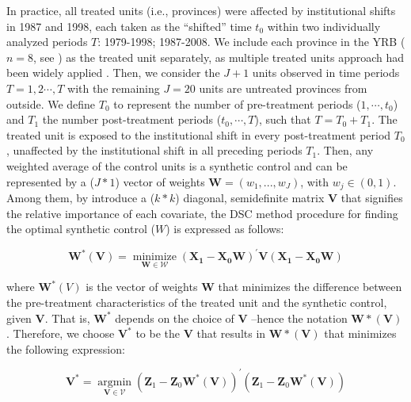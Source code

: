 \documentclass[default, sn-standardnature]{sn-jnl} %
\begin{document}
In practice, all treated units (i.e., provinces) were affected by institutional shifts in 1987 and 1998, each taken as the ``shifted'' time $t_0$ within two individually analyzed periods $T$: 1979-1998; 1987-2008.
We include each province in the YRB ($n=8$, see \textit{}) as the treated unit separately, as multiple treated units approach had been widely applied \cite{abadie2021}.
Then, we consider the $J+1$ units observed in time periods $T = {1,2 \cdots , T}$ with the remaining $J=20$ units are untreated provinces from outside.
We define $T_0$ to represent the number of pre-treatment periods ($1,\cdots,t_0$) and $T_1$ the number post-treatment periods ($t_0,\cdots,T$), such that $T = T_0+ T_1$.
The treated unit is exposed to the institutional shift in every post-treatment period $T_0$, unaffected by the institutional shift in all preceding periods $T_1$.
Then, any weighted average of the control units is a synthetic control and can be represented by a ($J * 1$) vector of weights $\mathbf{W} = (w_{1},...,w_{J})$, with $w_j \in (0, 1)$.
Among them, by introduce a ($k * k$) diagonal, semidefinite matrix $\mathbf{V}$ that signifies the relative importance of each covariate, the DSC method procedure for finding the optimal synthetic control ($W$) is expressed as follows:

\begin{equation}
    \mathbf{W^{*}(V)}=\underset{\mathbf{W} \in \mathcal{W}}{\operatorname{minimize}}\left(\mathbf{X}_{\mathbf{1}}-\mathbf{X}_{\mathbf{0}} \mathbf{W}\right)^{\prime} \mathbf{V}\left(\mathbf{X}_{\mathbf{1}}-\mathbf{X}_{\mathbf{0}} \mathbf{W}\right)
\end{equation}

where $\mathbf{W}^{*}(V)$ is the vector of weights $\mathbf{W}$ that minimizes the difference between the pre-treatment characteristics of the treated unit and the synthetic control, given $\mathbf{V}$. That is, $\mathbf{W^{*}}$ depends on the choice of $\mathbf{V}$ –hence the notation $\mathbf{W*(V)}$. Therefore, we choose $\mathbf{V^{*}}$ to be the $\mathbf{V}$ that results in $\mathbf{W*(V)}$ that minimizes the following expression:

\begin{equation}
    \mathbf{V}^{*}=\underset{\mathbf{V} \in \mathcal{V}}{\operatorname{argmin}}\left(\mathbf{Z}_{1}-\mathbf{Z}_{0} \mathbf{W}^{*}(\mathbf{V})\right)^{\prime}\left(\mathbf{Z}_{1}-\mathbf{Z}_{0} \mathbf{W}^{*}(\mathbf{V})\right)
\end{equation}
\end{document}
